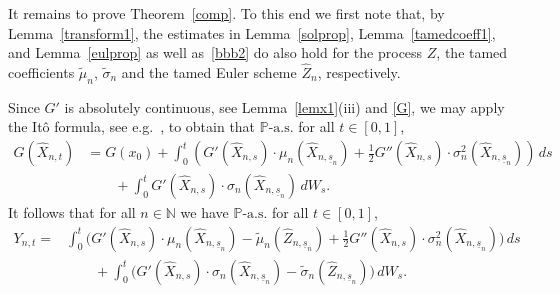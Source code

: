 \documentclass[11pt]{amsart}
\newcommand{\N}{{\mathbb N}}
\newcommand{\PP}{{\mathbb P}}
\newcommand{\eul}{{\widehat X}}
\newcommand{\eultr}{{\widehat Z}}
\newcommand{\usn}{\underline {s}_n}
\theoremstyle{plain}
\theoremstyle{definition}
\begin{document}
It remains to prove Theorem~\ref{comp}. To this end we first note that, by Lemma~\ref{transform1}, the estimates in Lemma~\ref{solprop}, Lemma~\ref{tamedcoeff1}, and Lemma~\ref{eulprop} as well as~\eqref{bbb2} do also hold for the process $Z$, the tamed coefficients $\widetilde \mu_n$, $\widetilde \sigma_n$ and the tamed Euler scheme $\widehat Z_n$, respectively.

Since $G'$ is absolutely continuous, see Lemma~\ref{lemx1}(iii) and \eqref{G}, we may apply the It\^{o} formula, see e.g.~\cite[Problem 3.7.3]{ks91}, to obtain that $\PP\text{-a.s.}$ for all $t\in[0,1]$,
\begin{align*}
	G(\eul_{n,t}) & = G(x_0)+\int_0^t(G'(\eul_{n,s})\cdot \mu_n(\eul_{n,\usn})+\tfrac{1}{2}G''(\eul_{n,s})\cdot\sigma_n^2(\eul_{n,\usn}))\,ds\\
	& \qquad +\int_0^t G'(\eul_{n,s})\cdot\sigma_n(\eul_{n,\usn})\,dW_s.
\end{align*}
It follows that for all $n\in\N$ we have $\PP\text{-a.s.}$ for all $t\in[0,1]$,
\begin{equation}\label{eq:diff_G_and_Z}
	\begin{aligned}
	Y_{n,t}= &
	\int_0^t  \bigl(G'(\eul_{n,s})\cdot  \mu_n(\eul_{n,\usn}) - \widetilde \mu_n(\eultr_{n,\usn})  +\tfrac{1}{2}G''(\eul_{n,s})\cdot\sigma_n^2(\eul_{n,\usn})\bigr)\,ds\\
		& \qquad +\int_0^t \bigl(G'(\eul_{n,s})\cdot\sigma_n(\eul_{n,\usn}) -\widetilde \sigma_n(\eultr_{n,\usn})\bigr) \,dW_s.
		\end{aligned}
\end{equation}
\end{document}
